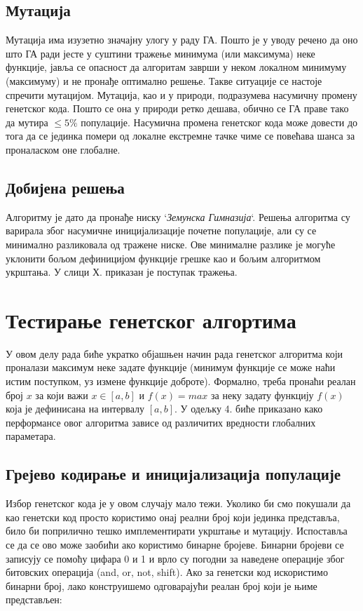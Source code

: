 \documentclass{article}
\begin{document}
\subsection{Мутација}
Мутација има изузетно значајну улогу у раду ГА. Пошто је у уводу речено
да оно што ГА ради јесте у суштини тражење минимума (или максимума) неке функције, јавља се 
опасност да алгоритам заврши у неком локалном минимуму (максимуму) и не пронађе 
оптимално решење. Такве ситуације се настоје спречити мутацијом. Мутација, као и у природи,
подразумева насумичну промену генетског кода. Пошто се она у природи ретко дешава, обично
се ГА праве тако да мутира $\leq 5 \%$ популације. Насумична промена генетског кода 
може довести до тога да се јединка помери од локалне екстремне тачке чиме се повећава 
шанса за проналаском оне глобалне.

\subsection{Добијена решења}
Алгоритму је дато да пронађе ниску `\textit{Земунска Гимназија}`. Решења алгоритма су варирала
због насумичне иницијализације почетне популације, али су се минимално разликовала од тражене ниске.
Ове минималне разлике је могуће уклонити бољом дефиницијом функције грешке као и бољим алгоритмом укрштања.
У слици Х. приказан је поступак тражења.


\section{Тестирање генетског алгортима}
У овом делу рада биће укратко објашњен начин рада генетског алгоритма који проналази
максимум неке задате функције (минимум функције се може наћи истим поступком, уз 
измене функције доброте). Формално, треба пронаћи реалан број $x$ за који важи $x \in [a, b]$ и 
$f(x) = max$ за неку задату функцију $f(x)$ која је дефинисана на интервалу $[a, b]$. 
У одељку 4. биће приказано како перформансе овог алгоритма зависе од различитих 
вредности глобалних параметара.

\subsection{Грејево кодирање и иницијализација популације}
Избор генетског кода је у овом случају мало тежи. Уколико би смо покушали да као генетски код
просто користимо онај реални број који јединка представља, било би поприлично тешко 
имплементирати укрштање и мутацију. Испоставља се да се ово може заобићи ако користимо
бинарне бројеве. Бинарни бројеви се записују се помоћу цифара 0 и 1 и врло су погодни за 
наведене операције због битовских операција (and, or, not, shift). Ако за генетски код
искористимо бинарни број, лако конструишемо одговарајући реалан број који је њиме представљен:
\end{document}

